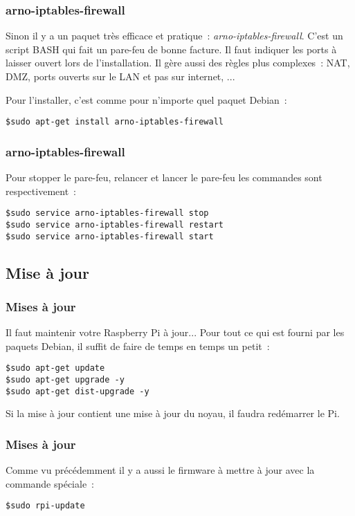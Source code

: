 \begin{frame}[containsverbatim]
\frametitle{arno-iptables-firewall}

Sinon il y a un paquet très efficace et pratique~: \emph{arno-iptables-firewall}. C'est un script BASH qui fait un pare-feu de bonne facture. Il faut indiquer les ports à laisser ouvert lors de l'installation. Il gère aussi des règles plus complexes~: NAT, DMZ, ports ouverts sur le LAN et pas sur internet, ... 

Pour l'installer, c'est comme pour n'importe quel paquet Debian~:
\begin{verbatim}
$sudo apt-get install arno-iptables-firewall
\end{verbatim}

\end{frame}

\begin{frame}[containsverbatim]
\frametitle{arno-iptables-firewall}

Pour stopper le pare-feu, relancer et lancer le pare-feu les commandes sont respectivement~:
\begin{verbatim}
$sudo service arno-iptables-firewall stop
$sudo service arno-iptables-firewall restart
$sudo service arno-iptables-firewall start
\end{verbatim}

\end{frame}

\subsection{Mise à jour}

\begin{frame}[containsverbatim]
\frametitle{Mises à jour}

Il faut maintenir votre Raspberry Pi à jour... Pour tout ce qui est fourni par les paquets Debian, il suffit de faire de temps en temps un petit~:
\begin{verbatim}
$sudo apt-get update
$sudo apt-get upgrade -y
$sudo apt-get dist-upgrade -y
\end{verbatim}

Si la mise à jour contient une mise à jour du noyau, il faudra redémarrer le Pi.

\end{frame}

\begin{frame}[containsverbatim]
\frametitle{Mises à jour}

Comme vu précédemment il y a aussi le firmware à mettre à jour avec la commande spéciale~:
\begin{verbatim}
$sudo rpi-update
\end{verbatim}

\end{frame}

